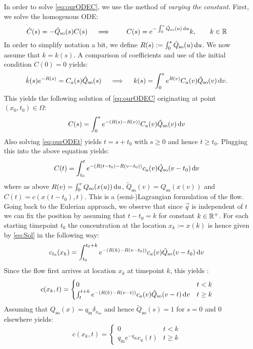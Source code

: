 \documentclass[paper=a4, fontsize=12pt,parskip=half,draft,headings=small]{scrartcl}
\newcommand{\qi}{q_{\mathrm{in}}}
\newcommand{\Qso}{Q_{\mathrm{so}}}
\newcommand{\tQso}{\tilde{Q}_{\mathrm{so}}}
\newcommand{\q}{\vec{q}}
\newcommand{\xso}{x_\mathrm{so}}
\begin{document}
\begin{remark}
			In order to solve \eqref{eq:ourODEC}, we use the method of \emph{varying the constant}. First, we solve the homogenous ODE: 
			\[
				\dot{C}(s) = -\tQso(s)C(s) \quad \implies \quad \quad C(s) = e^{-\int_{0}^s\tQso(u)\diff u} k, \qquad k\in\R
			\]
			In order to simplify notation a bit, we define $R(s):=\int_{0}^s\tQso(u) \diff u$.
			We now assume that $k = k(s)$. A comparison of coefficients and use of the initial condition $C(0)=0$ yields:
			\[
				\dot{k}(s) e^{-R(s)} = C_a(s)\tQso(s) \quad \implies \quad k(s) = \int_{0}^s e^{R(v)}C_a(v)\tQso(v) \diff v.
			\]
			This yields the following solution of \eqref{eq:ourODEC} originating at point $(x_0,t_0) \in \Omega$:
			\[
				C(s) = \int_{0}^{s} e^{-(R(s)-R(v))}C_a(v)\tQso(v)\diff v			
			\]
			Also solving \eqref{eq:ourODEt} yields $t = s + t_0$ with $s \ge 0$ and hence $t \ge t_0$. 
			Plugging this into the above equation yields:
			\begin{equation}
				\label{eq:Sol}
				C(t) = \int_{t_0}^{t} e^{-(R(t-t_0)-R(v-t_0))}c_a(v)\tQso(v-t_0)\diff v
			\end{equation}
			where as above $R(v)=\int_{0}^v\Qso(x(u)) \diff u$, $\tQso(v)=\Qso(x(v))$ and $C(t) = c(x(t-t_0),t)$.
			This is a (semi-)Lagrangian formulation of the flow. 
			Going back to the Eulerian approach, we observe that since $\q$ is independent of $t$ we can fix the position by assuming that $t-t_0=k$ for constant $k\in\mathbb{R}^+$. 
			For each starting timepoint $t_0$ the concentration at the location $x_k:=x(k)$ is hence given by \eqref{eq:Sol} in the following way:
			\[
				c_{t_0}(x_k) = \int_{t_0}^{t_0+k} e^{-(R(k)-R(v-t_0))}c_a(v)\tQso(v-t_0)\diff v
			\]
			Since the flow first arrives at location $x_k$ at timepoint $k$, this yields :
			\[
				c(x_k,t) =
				\begin{cases}
					0 & t<k\\
					\int_{t}^{t+k} e^{-(R(k)-R(v-t))}c_a(v)\tQso(v-t)\diff v & t \ge k
				\end{cases} 
			\]
			Assuming that $\Qso(x) = \qi \delta_{\xso}$ and hence $\tQso(s) = 1$ for $s=0$ and $0$ elsewhere yields:
			\[
				c(x_k,t) =
				\begin{cases}
					0 & t<k\\
					\qi e^{-\qi} c_a(t) & t \ge k
				\end{cases} 			
			\]
		\end{remark}
		
\end{document}
